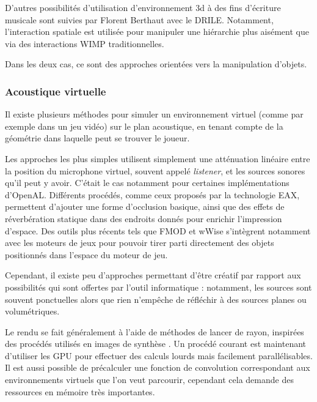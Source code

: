 \documentclass[french,12pt]{article}
\begin{document}
D'autres possibilités d'utilisation d'environnement 3d à des fins d'écriture musicale sont suivies par Florent Berthaut avec le DRILE\cite{berthaut_drile:_2010}. Notamment, l'interaction spatiale est utilisée pour manipuler une hiérarchie plus aisément que via des interactions \ac{WIMP} traditionnelles.

Dans les deux cas, ce sont des approches orientées vers la manipulation d'objets.

\subsubsection{Acoustique virtuelle}
Il existe plusieurs méthodes pour simuler un environnement virtuel (comme par exemple dans un jeu vidéo) sur le plan acoustique, en tenant compte de la géométrie dans laquelle peut se trouver le joueur.

Les approches les plus simples utilisent simplement une atténuation linéaire entre la position du microphone virtuel, souvent appelé \textit{listener}, et les sources sonores qu'il peut y avoir. C'était le cas notamment pour certaines implémentations d'OpenAL\cite{hiebert_openal_2005}. Différents procédés, comme ceux proposés par la technologie EAX\cite{funkhouser_survey_2003}, permettent d'ajouter une forme d'occlusion basique, ainsi que des effets de réverbération statique dans des endroits donnés pour enrichir l'impression d'espace. Des outils plus récents tels que FMOD et wWise s'intègrent notamment avec les moteurs de jeux pour pouvoir tirer parti directement des objets positionnés dans l'espace du moteur de jeu.

Cependant, il existe peu d'approches permettant d'être créatif par rapport aux possibilités qui sont offertes par l'outil informatique : notamment, les sources sont souvent ponctuelles alors que rien n'empêche de réfléchir à des sources planes ou volumétriques. 

Le rendu se fait généralement à l'aide de méthodes de lancer de rayon, inspirées des procédés utilisés en images de synthèse \cite{funkhouser_beam_1998,tsingos_fast_1998}.
Un procédé courant est maintenant d'utiliser les \ac{GPU} pour effectuer des calculs lourds mais facilement parallélisables\cite{rodriguez_performance_2014,cheng_design_2014,taylor_guided_2012}. Il est aussi possible de précalculer une fonction de convolution correspondant aux environnements virtuels que l'on veut parcourir, cependant cela demande des ressources en mémoire très importantes\cite{raghuvanshi_parametric_2014}.
\end{document}
